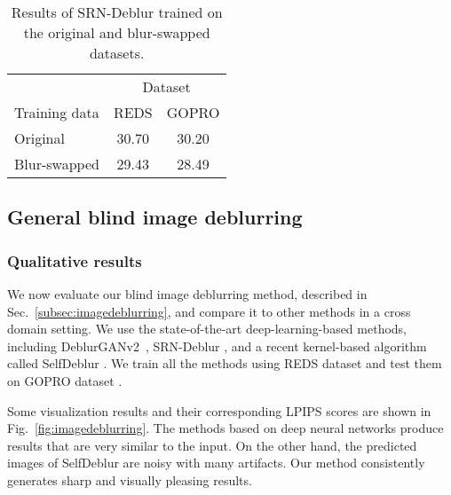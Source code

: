 \documentclass[final]{cvpr}
\newcommand{\Sref}[1]{Sec.~\ref{#1}}
\newcommand{\Fref}[1]{Fig.~\ref{#1}}
\begin{document}
\setlength{\tabcolsep}{20pt}
\begin{table}[ht]
    \centering
    \begin{tabular}{lcc}
        \toprule
          & \multicolumn{2}{c}{Dataset}\\
         \cmidrule(lr){2-3}
         Training data & REDS & GOPRO \\
         \midrule
         Original & 30.70 & 30.20 \\
         Blur-swapped & 29.43& 28.49 \\
         \bottomrule
    \end{tabular}
    \vskip 0.05in
    \caption{Results of SRN-Deblur trained \cite{tao2018scale} on the original and blur-swapped datasets.}
    \label{tab:synexp}
\end{table}

\subsection{General blind image deblurring}
\subsubsection{Qualitative results}
We now evaluate our blind image deblurring method, described in \Sref{subsec:imagedeblurring}, and compare it to other methods in a cross domain setting. We use the state-of-the-art deep-learning-based methods, including DeblurGANv2~\cite{kupyn2019deblurgan}, SRN-Deblur \cite{tao2018scale}, and a recent kernel-based algorithm called SelfDeblur \cite{ren2020neural}. We train all the methods using REDS dataset \cite{nah2019ntire} and test them on GOPRO dataset \cite{nah2017deep}.

Some visualization results and their corresponding LPIPS scores \cite{zhang2018unreasonable} are shown in \Fref{fig:imagedeblurring}. The methods based on deep neural networks  \cite{kupyn2019deblurgan,tao2018scale} produce results that are very similar to the input. On the other hand, the predicted images of  SelfDeblur \cite{ren2020neural} are noisy with many artifacts. Our method consistently generates sharp and visually pleasing results.
\end{document}
